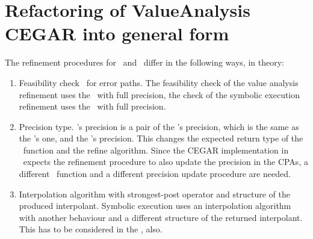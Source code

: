 \section{Refactoring of ValueAnalysis CEGAR into general form}
The refinement procedures for \ and \symbolicExecutionCPA\ differ in the following ways, in theory:
\begin{enumerate}
\item
Feasibility check \isFeasibleFunc\ for error paths.
The feasibility check of the value analysis refinement uses the \ with full precision, the check of the symbolic execution refinement uses the \symbolicExecutionCPA\ with full precision.

\item
Precision type. \SymbolicExecutionCPA's precision is a pair of the \symbolicValueAnalysisCPA's precision, which is the same as the 's one, and the \constraintsCPA's precision. This changes the expected return type of the \extractPrecisionFunc\ function and the refine algorithm.
Since the CEGAR implementation in \cpaChecker\ expects the refinement procedure to also update the precision in the CPAs, a different \extractPrecisionFunc\ function and a different
precision update procedure are needed.

\item
Interpolation algorithm with strongest-post operator and structure of the produced interpolant.
Symbolic execution uses an interpolation algorithm with another behaviour and a different structure of the returned interpolant.
This has to be considered in the \extractPrecisionFunc, also.
\end{enumerate}

